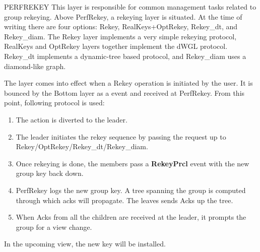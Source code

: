 %
%
%
\begin{Layer}{PERFREKEY}
\label{layer:perfrekey}
This layer is responsible for common management tasks related to group
rekeying. Above PerfRekey, a rekeying layer is situated. At the time
of writing there are four options: Rekey, RealKeys+OptRekey, Rekey\_dt,
and Rekey\_diam. The Rekey layer implements a very simple rekeying
protocol, RealKeys and OptRekey layers together implement the dWGL
protocol. Rekey\_dt implements a dynamic-tree based protocol, and
Rekey\_diam uses a diamond-like graph. 

\begin{Protocol}
The layer comes into effect when a Rekey operation is
initiated by the user. It is bounced by the Bottom layer as a 
event and received at PerfRekey. From this point, following protocol is used: 

\begin{enumerate}
\item The  action is diverted to the leader.
\item The leader initiates the rekey sequence by 
 passing the request up to Rekey/OptRekey/Rekey\_dt/Rekey\_diam.
\item Once rekeying is done, the members pass a {\bf RekeyPrcl} event with 
    the new group key back down. 
\item PerfRekey logs the new group key. A tree spanning the group 
    is computed through which acks will propagate. The leaves 
    sends Acks up the tree.
\item When Acks from all the children are received at the leader,
    it prompts the group for a view change. 
\end{enumerate}

In the upcoming view, the new key will be installed. 


\end{Protocol}
\end{Layer}
